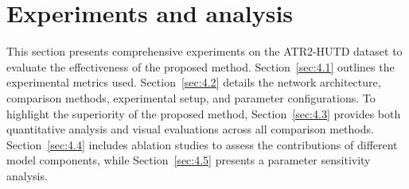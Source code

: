 \section{Experiments and analysis} \label{sec:5}
This section presents comprehensive experiments on the ATR2-HUTD dataset to evaluate the effectiveness of the proposed method. 
Section~\ref{sec:4.1} outlines the experimental metrics used. 
Section~\ref{sec:4.2} details the network architecture, comparison methods, experimental setup, and parameter configurations. 
To highlight the superiority of the proposed method, Section~\ref{sec:4.3} provides both quantitative analysis and visual evaluations across all comparison methods. 
Section~\ref{sec:4.4} includes ablation studies to assess the contributions of different model components, while Section~\ref{sec:4.5} presents a parameter sensitivity analysis.
